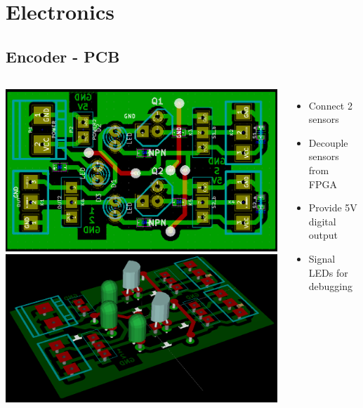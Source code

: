 \documentclass[pdf]{beamer}
\begin{document}
\section{Electronics}
\subsection{Encoder - PCB}
\begin{frame}
  \begin{columns}
      \begin{center}
      \includegraphics[width = 1.0\textwidth]{pics/raw/sensor.png}\\
      \includegraphics[width = 1.0\textwidth]{pics/raw/sensor2.png}
      \end{center}
      \begin{itemize}
        \item Connect 2 sensors
        \item Decouple sensors from FPGA
        \item Provide 5V digital output
        \item Signal LEDs for debugging
      \end{itemize}
  \end{columns}
\end{frame}
\end{document}

